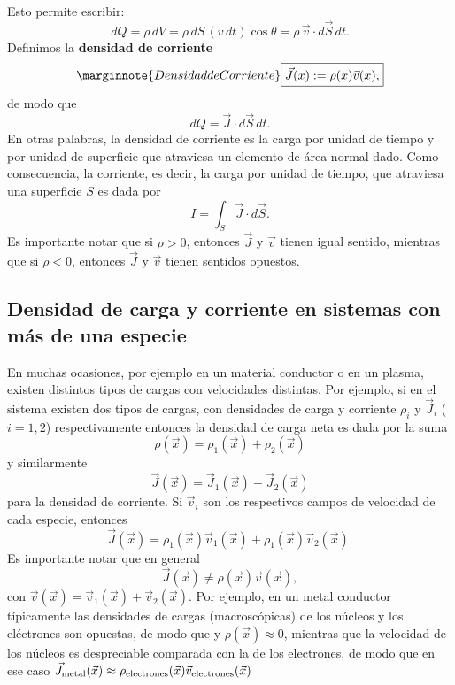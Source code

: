 Esto permite escribir:
\begin{equation}
dQ=\rho\, dV=\rho\, dS\,(v\,dt)\cos\theta=\rho\,\vec{v}\cdot d\vec{S}\,dt.
\end{equation}
Definimos la \textbf{densidad de corriente}
\begin{equation}\marginnote{Densidad de Corriente}
\boxed{\vec{J}(x):=\rho(x)\vec{v}(x),}
\end{equation}
de modo que
\begin{equation}
 dQ=\vec{J}\cdot d\vec{S}\,dt .
\end{equation}
En otras palabras, la densidad de corriente es la carga por unidad de tiempo y
por unidad de superficie que atraviesa un elemento de área normal dado.
Como consecuencia, la corriente, es decir, la carga por unidad de tiempo,
que atraviesa una superficie $S$ es dada por
\begin{equation}
I=\int_{S}\vec{J}\cdot d\vec{S}.
\end{equation}
Es importante notar que si $\rho>0$, entonces $\vec{J}$ y $\vec{v}$ tienen igual
sentido, mientras que si $\rho<0$, entonces $\vec{J}$ y $\vec{v}$ tienen
sentidos opuestos.

\subsection{Densidad de carga y corriente en sistemas con más de una especie}

En muchas ocasiones, por ejemplo en un material conductor o en un plasma, existen distintos tipos de cargas con velocidades distintas. Por ejemplo, si en el sistema existen dos tipos de cargas, con densidades de carga y corriente $\rho_i$ y $\vec{J}_i$ ($i=1,2$) respectivamente entonces la densidad de carga neta es dada por la suma
\begin{equation}
\rho(\vec{x}) = \rho_1(\vec{x}) + \rho_2(\vec{x})
\end{equation}
y similarmente
\begin{equation}
\vec{J}(\vec{x}) = \vec{J}_1(\vec{x}) + \vec{J}_2(\vec{x}) 
\end{equation}
para la densidad de corriente. Si $\vec{v}_i$ son los respectivos campos de velocidad de cada especie, entonces
\begin{equation}
\vec{J}(\vec{x}) = \rho_1(\vec{x})\vec{v}_1(\vec{x}) + \rho_1(\vec{x})\vec{v}_2(\vec{x}) .
\end{equation}
Es importante notar que en general 
\begin{equation}
\vec{J}(\vec{x}) \neq  \rho(\vec{x})\vec{v}(\vec{x}),
\end{equation}
con $\vec{v}(\vec{x})=\vec{v}_1(\vec{x})+\vec{v}_2(\vec{x})$. Por ejemplo, en un metal conductor típicamente las densidades de cargas (macroscópicas) de los núcleos y los eléctrones son opuestas, de modo que y $\rho(\vec{x})\approx 0$, mientras que la velocidad de los núcleos es despreciable comparada con la de los electrones, de modo que en ese caso $\vec{J}_{\rm metal}(\vec{x})\approx  \rho_{\rm electrones}(\vec{x})\vec{v}_{\rm electrones}(\vec{x})$
